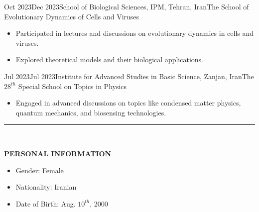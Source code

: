 \documentclass[11pt, b4paper]{cv}
\begin{document}
\begin{school}{Oct 2023}{Dec 2023}{School of Biological Sciences, IPM, Tehran, Iran}{The School of Evolutionary Dynamics of Cells and Viruses}
	\begin{itemize}
	    \item Participated in lectures and discussions on evolutionary dynamics in cells and viruses.
	    \item Explored theoretical models and their biological applications.
	\end{itemize}
\end{school}
\vspace{-0.1in}

\begin{school}{Jul 2023}{Jul 2023}{Institute for Advanced Studies in Basic Science, Zanjan, Iran}{The $28^{th}$ Special School on Topics in Physics}
	\begin{itemize}
	    \item Engaged in advanced discussions on topics like condensed matter physics, quantum mechanics, and biosensing technologies.
	\end{itemize}
\end{school}



\vspace{-0.15in}
\rule{\textwidth}{1pt}\\
\vspace{-0.15in}

\textbf{PERSONAL INFORMATION}
\vspace{-0.1in}

\begin{multicols}{3}[\columnsep=0cm]
	\begin{itemize}
	  \item Gender: Female
	  \item Nationality: Iranian
	  \item Date of Birth: Aug. $10^{th}$, 2000
	\end{itemize}
\end{multicols}
\end{document}
